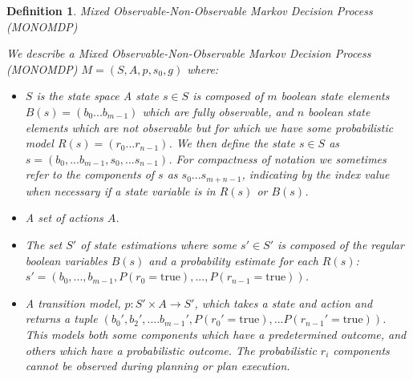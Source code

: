 \documentclass[11pt]{article}
\newtheorem{definition}{Definition}
\begin{document}
\begin{definition}{Mixed Observable-Non-Observable Markov Decision Process (MONOMDP) }\label{def:mdpp}

  We describe a \emph{Mixed Observable-Non-Observable Markov Decision
  Process} (MONOMDP) $M = (S, A, p, s_0, g)$ where:







  \begin{itemize}
  \item $S$ is the state space A state $s \in S$ is composed of $m$
    boolean state elements $B(s) = (b_{0}...b_{m-1})$ which are fully
    observable, and $n$ boolean state elements which are not
    observable but for which we have some probabilistic model $R(s) =
    (r_{0}...r_{n-1})$. We then define the state $s \in S$ as $s =
    (b_0,...b_{m-1},s_0,...s_{n-1})$. For compactness of notation we
    sometimes refer to the components of $s$ as $s_0...s_{m+n-1}$,
    indicating by the index value when necessary if a state variable
    is in $R(s)$ or $B(s)$.

  \item A set of actions $A$.

  \item The set $S'$ of state estimations where some $s' \in S'$ is
    composed of the regular boolean variables $B(s)$ and a probability
    estimate for each $R(s)$: $s' =
    (b_0,...,b_{m-1},P(r_0=\text{true}),...,P(r_{n-1}=\text{true}))$.

  \item A transition model, $p: S' \times A \rightarrow S'$, which
    takes a state and action and returns a tuple $(b_{0}', b_{2}',
    .... b_{m-1}',
    P(r_0'=\text{true}),...P(r_{n-1}'=\text{true}))$. This models both
    some components which have a predetermined outcome, and others
    which have a probabilistic outcome. The probabilistic $r_i$
    components cannot be observed during planning or plan execution.


\end{itemize}
\end{definition}
\end{document}
